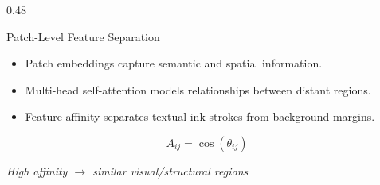 \documentclass[aspectratio=169]{beamer}
\begin{document}
\begin{frame}
\begin{columns}[T,onlytextwidth]
\begin{column}{0.48\textwidth}
\begin{block}{Patch-Level Feature Separation}
\scriptsize

\begin{itemize}
    \setlength{\itemsep}{1pt}
    \setlength{\parskip}{0pt}
    \item Patch embeddings capture semantic and spatial information.
    \item Multi-head self-attention models relationships between distant regions.
    \item Feature affinity separates textual ink strokes from background margins.
\end{itemize}

\vspace{-0.08cm}

\[
A_{ij}=\cos(\theta_{ij})
\]

\vspace{-0.15cm}

\begin{center}
\textit{High affinity $\rightarrow$ similar visual/structural regions}
\end{center}

\end{block}

\end{column}

\end{columns}

\end{frame}
\end{document}
